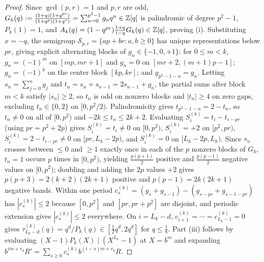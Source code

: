 \documentclass[11pt]{article}
\begin{document}
\begin{proof}
Since $\gcd(p,r)=1$ and $p,r$ are odd, $G_k(q):=\frac{(1+q)(1+q^{pr})}{(1+q^p)(1+q^r)}=\sum_{n=0}^{p^2-1}g_nq^n\in\mathbb Z[q]$ is palindromic of degree $p^2-1$, $P_k(1)=1$, and $A_k(q)=(1-q^{pr})\frac{1+q}{1-q}G_k(q)\in\mathbb Z[q]$, proving (i). Substituting $x=-q$, the semigroup $\mathcal S_{p,r}=\{ap+br:a,b\ge0\}$ has unique representations below $pr$, giving explicit alternating blocks of $g_n\in\{-1,0,+1\}$: for $0\le m<k$, $g_n=(-1)^m$ on $[mp,mr+1]$ and $g_n=0$ on $[mr+2,(m+1)p-1]$; $g_n=(-1)^k$ on the center block $[kp,kr]$; and $g_{p^2-1-n}=g_n$. Letting $s_n=\sum_{j=0}^n g_j$ and $t_n=s_n+s_{n-1}=2s_{n-1}+g_n$, the partial sums after block $m<k$ satisfy $|s_n|\ge2$, so $t_n$ is odd on nonzero blocks and $|t_n|\ge4$ on zero gaps, excluding $t_n\in\{0,2\}$ on $[0,p^2/2)$. Palindromicity gives $t_{p^2-1-n}=2-t_n$, so $t_n\neq0$ on all of $[0,p^2)$ and $-2k\le t_n\le 2k+2$. Evaluating $S_i^{(k)}=t_i-t_{i-pr}$ (using $pr=p^2+2p$) gives $S_i^{(k)}=t_i\neq0$ on $[0,p^2)$, $S_i^{(k)}=+2$ on $[p^2,pr)$, $S_i^{(k)}=2-t_{i-pr}\neq0$ on $[pr,L_k-2p)$, and $S_i^{(k)}=0$ on $[L_k-2p,L_k)$. Since $s_n$ crosses between $\le0$ and $\ge1$ exactly once in each of the $p$ nonzero blocks of $G_k$, $t_n=1$ occurs $p$ times in $[0,p^2)$, yielding $\frac{p(p+1)}{2}$ positive and $\frac{p(p-1)}{2}$ negative values on $[0,p^2)$; doubling and adding the $2p$ values $+2$ gives $p(p+3)=2(k+2)(2k+1)$ positive and $p(p-1)=2k(2k+1)$ negative bands. Within one period $c_s^{(k)}=(g_s+g_{s-1})-(g_{s-pr}+g_{s-1-pr})$ has $|c_s^{(k)}|\le2$ because $[0,p^2]$ and $[pr,pr+p^2]$ are disjoint, and periodic extension gives $|c_s^{(k)}|\le2$ everywhere. On $i=L_k-d$, $c_{i+1}^{(k)}=\cdots=c_{L_k-1}^{(k)}=0$ gives $\tau_{L_k-d}^{(k)}(q)=q^d/P_k(q)\in[\frac12q^d,2q^d]$ for $q\le\frac18$. Part (iii) follows by evaluating $(X-1)P_k(X)\mid(X^{L_k}-1)$ at $X=b^m$ and expanding $b^{im+r_0}R'=\sum_{s\ge0}c_s^{(k)}b^{(i-s)m+r_0}R$.
\end{proof}
\end{document}

